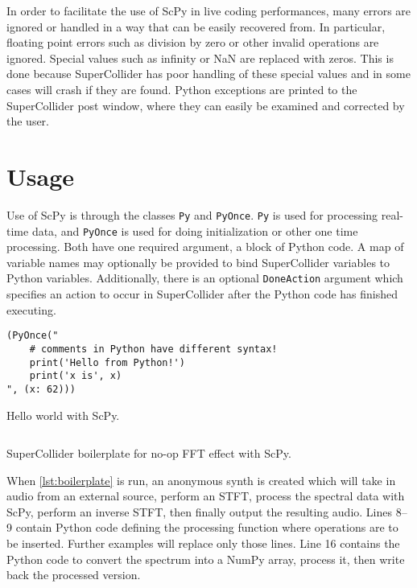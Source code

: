 \documentclass{article}
\begin{document}
In order to facilitate the use of ScPy in live coding performances, many errors are ignored or
handled in a way that can be easily recovered from. In particular, floating point errors such as
division by zero or other invalid operations are ignored. Special values such as infinity or NaN
are replaced with zeros. This is done because SuperCollider has poor handling of these special
values and in some cases will crash if they are found. Python exceptions are printed to the
SuperCollider post window, where they can easily be examined and corrected by the user.

\section{Usage}\label{sec:usage}

Use of ScPy is through the classes \texttt{Py} and \texttt{PyOnce}. \texttt{Py} is used for
processing real-time data, and \texttt{PyOnce} is used for doing initialization or other one time
processing. Both have one required argument, a block of Python code. A map of variable names may
optionally be provided to bind SuperCollider variables to Python variables. Additionally, there is
an optional \texttt{DoneAction} argument which specifies an action to occur in SuperCollider after
the Python code has finished executing.

\begin{listing}[ht]
    \begin{verbatim}
(PyOnce("
    # comments in Python have different syntax!
    print('Hello from Python!')
    print('x is', x)
", (x: 62)))
    \end{verbatim}
    \caption{Hello world with ScPy.}
    \label{lst:helloworld}
\end{listing}

\begin{listing}[ht]
    \inputminted[linenos=true]{SuperCollider}{../examples/template.sc}
    \caption{SuperCollider boilerplate for no-op FFT effect with ScPy.}
    \label{lst:boilerplate}
\end{listing}

When \autoref{lst:boilerplate} is run, an anonymous synth is created which will take in audio
from an external source, perform an STFT, process the spectral data with ScPy, perform an inverse
STFT, then finally output the resulting audio. Lines 8--9 contain Python code defining the
processing function where operations are to be inserted. Further examples will replace only those
lines. Line 16 contains the Python code to convert the spectrum into a NumPy array, process it,
then write back the processed version.
\end{document}
